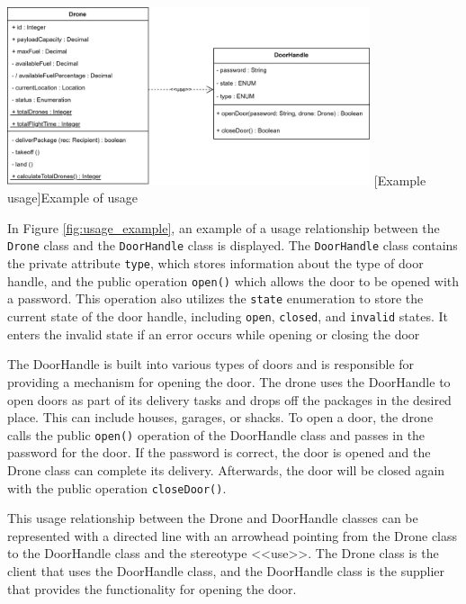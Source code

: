 \documentclass[
	12pt,
    a4paper,
    egregdoesnotlikesansseriftitles, %
    toc=chapterentrywithdots,
    oneside, openany,
    titlepage,
    parskip=half,
    headings=normal,  %
    listof=totoc,
    bibliography=totoc,
    index=totoc,
    captions=tableheading,  %
    listof=flat,
    numbers=noenddot, %
    final]
    {scrbook}
\begin{document}

\vspace{1em}
\begin{minipage}{\linewidth}
	\centering
	\includegraphics[width=0.8\textwidth]{figures/dependencies/usage.jpg}
	[Example usage]{Example of usage}
	\label{fig:usage_example}
\end{minipage}
\vspace{1em}


In Figure \ref{fig:usage_example}, an example of a usage relationship between the \texttt{Drone} class and the \texttt{DoorHandle} class is displayed. The \texttt{DoorHandle} class contains the private attribute \texttt{type}, which stores information about the type of door handle, and the public operation \texttt{open()} which allows the door to be opened with a password.
This operation also utilizes the \texttt{state} enumeration to store the current state of the door handle, including \texttt{open}, \texttt{closed}, and \texttt{invalid} states.
It enters the invalid state if an error occurs while opening or closing the door

The DoorHandle is built into various types of doors and is responsible for providing a mechanism for opening the door. 
The drone uses the DoorHandle to open doors as part of its delivery tasks and drops off the packages in the desired place. 
This can include houses, garages, or shacks. 
To open a door, the drone calls the public \texttt{open()} operation of the DoorHandle class and passes in the password for the door. 
If the password is correct, the door is opened and the Drone class can complete its delivery. 
Afterwards, the door will be closed again with the public operation \texttt{closeDoor()}.

This usage relationship between the Drone and DoorHandle classes can be represented with a directed line with an arrowhead pointing from the Drone class to the DoorHandle class and the stereotype <<use>>. The Drone class is the client that uses the DoorHandle class, and the DoorHandle class is the supplier that provides the functionality for opening the door.
\end{document}
